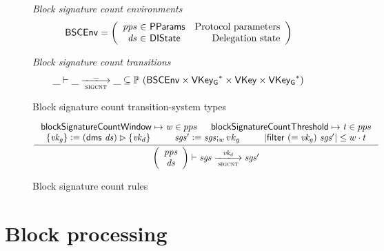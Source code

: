 \documentclass[11pt,a4paper]{article}
\newcommand{\powerset}[1]{\mathbb{P}~#1}
\newcommand{\restrictrange}{\rhd}
\newcommand{\var}[1]{\mathit{#1}}
\newcommand{\fun}[1]{\mathsf{#1}}
\newcommand{\type}[1]{\mathsf{#1}}
\newcommand{\pp}[1]{\mathsf{#1}}
\newcommand{\size}[1]{\left| #1 \right|}
\newcommand{\trans}[2]{\xlongrightarrow[\textsc{#1}]{#2}}
\newcommand{\seqof}[1]{#1^{*}}
\newcommand{\leteq}{\ensuremath{\mathrel{\mathop:}=}}
\newcommand{\partialf}{\mapsto}
\newcommand{\VKey}{\type{VKey}}
\newcommand{\VKeyGen}{\type{VKey_G}}
\newcommand{\DelegState}{\type{DIState}}
\newcommand{\ProtParams}{\type{PParams}} %
\begin{document}
\begin{figure}[ht]
  \emph{Block signature count environments}
  \begin{equation*}
    \BSCEnv =
    \left(
      \begin{array}{r@{~\in~}lr}
        \var{pps} & \ProtParams & \text{Protocol parameters} \\
        \var{ds} & \DelegState & \text{Delegation state} \\
      \end{array}
    \right)
  \end{equation*}

  \emph{Block signature count transitions}
  \begin{equation*}
    \_ \vdash \var{\_} \trans{sigcnt}{\_} \var{\_} \subseteq
    \powerset (\BSCEnv \times \seqof{\VKeyGen} \times \VKey \times \seqof{\VKeyGen})
  \end{equation*}
  \caption{Block signature count transition-system types}
  \label{fig:ts-types:sigcnt}
\end{figure}

\begin{figure}[ht]
  \begin{equation*}
    \inference
    {
      \pp{blockSignatureCountWindow} \partialf \var{w} \in pps & \pp{blockSignatureCountThreshold} \partialf \var{t} \in pps \\
      \{\var{vk_g}\} \leteq (\fun{dms} ~ \var{ds}) \restrictrange \{\var{vk_d}\}
      & \var{sgs'} \leteq \var{sgs};_w {vk_g} &
      \size{\fun{filter}~(=\var{vk_g})~\var{sgs'}} \leq w \cdot t \\
    }
    {
      \left(
        {\begin{array}{c}
           \var{pps} \\
           \var{ds}
         \end{array}}
     \right)
     \vdash
     {\var{sgs}}
     \trans{sigcnt}{\var{vk_d}}
     {\var{sgs'}}
   }
   \label{eq:rule:sigcnt}
 \end{equation*}
 \caption{Block signature count rules}
 \label{fig:rules:sigcnt}
\end{figure}

\clearpage

\section{Block processing}
\label{sec:block-processing}

\newcommand{\BHEnv}{\type{BHEnv}}
\newcommand{\BHState}{\type{BHState}}
\end{document}
